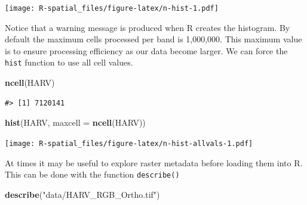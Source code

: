 \documentclass[
]{book}
\newenvironment{Shaded}{\begin{snugshade}}{\end{snugshade}}
\newcommand{\AttributeTok}[1]{\textcolor[rgb]{0.13,0.29,0.53}{#1}}
\newcommand{\FunctionTok}[1]{\textcolor[rgb]{0.13,0.29,0.53}{\textbf{#1}}}
\newcommand{\NormalTok}[1]{#1}
\newcommand{\StringTok}[1]{\textcolor[rgb]{0.31,0.60,0.02}{#1}}
\begin{document}
\texttt{[image: R-spatial\_files/figure-latex/n-hist-1.pdf]}

Notice that a warning message is produced when R creates the histogram. By default the maximum cells processed per band is 1,000,000. This maximum value is to ensure processing efficiency as our data become larger. We can force the \texttt{hist} function to use all cell values.

\begin{Shaded}
\begin{Highlighting}[]
\FunctionTok{ncell}\NormalTok{(HARV)}
\end{Highlighting}
\end{Shaded}

\begin{verbatim}
#> [1] 7120141
\end{verbatim}

\begin{Shaded}
\begin{Highlighting}[]
\FunctionTok{hist}\NormalTok{(HARV, }\AttributeTok{maxcell =} \FunctionTok{ncell}\NormalTok{(HARV))}
\end{Highlighting}
\end{Shaded}

\texttt{[image: R-spatial\_files/figure-latex/n-hist-allvals-1.pdf]}

At times it may be useful to explore raster metadata before loading them into R. This can be done with the function \texttt{describe()}

\begin{Shaded}
\begin{Highlighting}[]
\FunctionTok{describe}\NormalTok{(}\StringTok{"data/HARV\_RGB\_Ortho.tif"}\NormalTok{)}
\end{Highlighting}
\end{Shaded}
\end{document}
